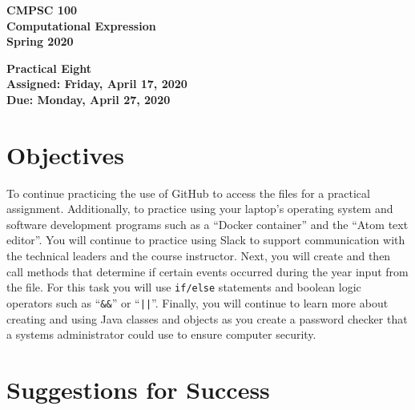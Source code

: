 \documentclass[11pt]{article}
\newcommand{\assignmentduedate}{April 27}
\newcommand{\assignmentassignedate}{April 17}
\newcommand{\assignmentnumber}{Eight}
\newcommand{\labyear}{2020}
\newcommand{\labdueday}{Monday}
\newcommand{\labassignday}{Friday}
\newcommand{\assigneddate}{Assigned: \labassignday, \assignmentassignedate, \labyear{}}
\newcommand{\duedate}{Due: \labdueday, \assignmentduedate, \labyear{}}
\newcommand{\labtitle}[1]
{
  \begin{center}
    \begin{center}
      \bf
      CMPSC 100\\Computational Expression\\
      Spring 2020\\
      \medskip
    \end{center}
    \bf
    #1
  \end{center}
}
\begin{document}
\thispagestyle{empty}

\labtitle{Practical \assignmentnumber{} \\ \assigneddate{} \\ \duedate{}}

\section*{Objectives}

To continue practicing the use of GitHub to access the files for a practical
assignment. Additionally, to practice using your laptop's operating system and
software development programs such as a ``Docker container'' and the ``Atom
text editor''. You will continue to practice using Slack to support
communication with the technical leaders and the course instructor. Next, you
will create and then call methods that determine if certain events occurred
during the year input from the file. For this task you will use {\tt if/else}
statements and boolean logic operators such as ``{\tt \&\&}'' or ``{\tt ||}''.
Finally, you will continue to learn more about creating and using Java classes
and objects as you create a password checker that a systems administrator could
use to ensure computer security.

\section*{Suggestions for Success}
\end{document}
